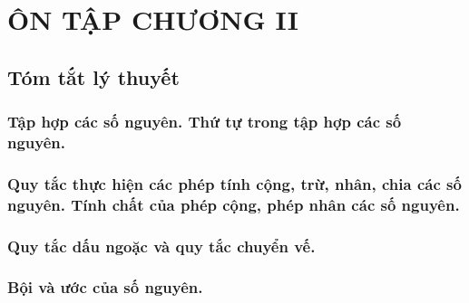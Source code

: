 \section{ÔN TẬP CHƯƠNG II}
\subsection{Tóm tắt lý thuyết}
\subsubsection{Tập hợp các số nguyên. Thứ tự trong tập hợp các số nguyên.}
\subsubsection{Quy tắc thực hiện các phép tính cộng, trừ, nhân, chia các số nguyên. Tính chất của phép cộng, phép nhân các số nguyên.}
\subsubsection{Quy tắc dấu ngoặc và quy tắc chuyển vế.}
\subsubsection{Bội và ước của số nguyên.}

